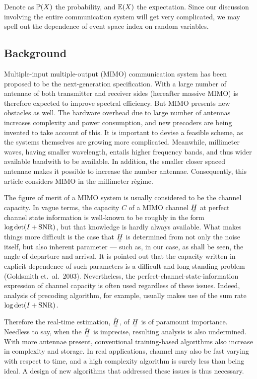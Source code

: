Denote as \(\mathbb{P} (X)\) the probability, and \(\mathbb{E} (X)\) the expectation.
Since our discussion involving the entire communication system will get very complicated, we may spell out the dependence of event space index on random variables.

\subsection{Background}

Multiple-input multiple-output (MIMO) communication system has been proposed to be the next-generation specification.
With a large number of antennae of both transmitter and receiver sides (hereafter massive MIMO) is therefore expected to improve spectral efficiency.
But MIMO presents new obstacles as well.
The hardware overhead due to large number of antennas increases complexity and power consumption, and new precoders are being invented to take account of this.
It is important to devise a feasible scheme, as the systems themselves are growing more complicated.
Meanwhile, millimeter waves, having smaller wavelength, entails higher frequency bands, and thus wider available bandwith to be available.
In addition, the smaller closer spaced antennae makes it possible to increase the number antennae.
Consequently, this article considers MIMO in the millimeter r\`egime.

The figure of merit of a MIMO system is usually considered to be the channel capacity.
In vague terms, the capacity \(C\) of a MIMO channel \(\M{H}\) at perfect channel state information is well-known to be roughly in the form \(\log \det (I +\mathrm{SNR})\), but that knowledge is hardly always available.
What makes things more difficult is the case that \(\M{H}\) is determined from not only the noise itself, but also inherent parameter --- such as, in our case, as shall be seen, the angle of departure and arrival.
It is pointed out that the capacity written in explicit dependence of such parameters is a difficult and long-standing problem (Goldsmith et.\ al.\ 2003).
Nevertheless, the perfect-channel-state-information expression of channel capacity is often used regardless of these issues.
Indeed, analysis of precoding algorithm, for example, usually makes use of the sum rate \(\log \det (I +\mathrm{SNR})\).

Therefore the real-time estimation, \(\hat{\M{H}}\), of \(\M{H}\) is of paramount importance.
Needless to say, when the \(\hat{\M{H}}\) is imprecise, resulting analysis is also undermined.
With more antennae present, conventional training-based algorithms also increase in complexity and storage.
In real applications, channel may also be fast varying with respect to time, and a high complexity algorithm is surely less than being ideal.
A design of new algorithms that addressed these issues is thus necessary.

